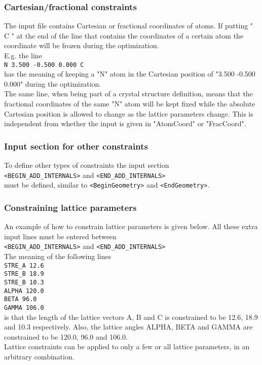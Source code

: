 \documentclass[prl,aps,preprint,superbib,12pt]{revtex4}
\begin{document}
\subsubsection{Cartesian/fractional constraints}
The input file contains Cartesian or fractional coordinates of atoms.
If putting " C " at the end of the line that contains the coordinates
of a certain atom the coordinate will be frozen during the optimization.
\\
E.g. the line
\\
{\tt N    3.500  -0.500   0.000 C}
\\
has the meaning of keeping a "N" atom in the Cartesian position
of "3.500  -0.500   0.000" during the optimization. 
\\
The same line, when
being part of a crystal structure definition, means that
the fractional coordinates of the same "N" atom will be kept fixed
while the absolute Cartesian position is allowed to change as the 
lattice parameters change. This is independent from whether 
the input is given in "AtomCoord" or "FracCoord".

\subsubsection{Input section for other constraints}
To define other types of constraints the input section
\\
{\tt <BEGIN\_ADD\_INTERNALS>} and {\tt <END\_ADD\_INTERNALS>}
\\
must be defined, similar to {\tt <BeginGeometry>} and
{\tt <EndGeometry>}.

\subsubsection{Constraining lattice parameters}
An example of how to constrain lattice parameters is given
below. All these extra input lines must be entered between
\\
{\tt <BEGIN\_ADD\_INTERNALS>} and {\tt <END\_ADD\_INTERNALS>}
\\
The meaning of the following lines
\\
{\tt STRE\_A 12.6}
\\
{\tt STRE\_B 18.9}
\\
{\tt STRE\_B 10.3}
\\
{\tt ALPHA 120.0}
\\
{\tt BETA  96.0}
\\
{\tt GAMMA 106.0}
\\
is that the length of the lattice vectors A, B and C is constrained to
be 12.6, 18.9 and 10.3 respectively. Also, the lattice angles ALPHA, BETA
and GAMMA are constrained to be 120.0, 96.0 and 106.0.
\\
Lattice constraints can be applied to only a few or all lattice parameters,
in an arbitrary combination.
\end{document}
